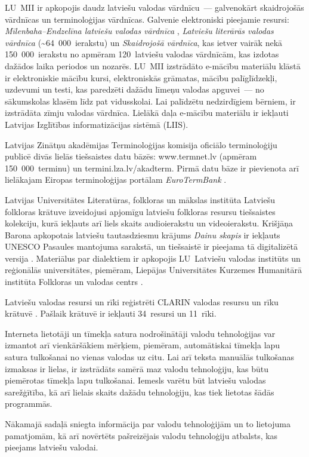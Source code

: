 \begin{multicols}{2}
LU~MII ir apkopojis daudz latviešu valodas vārd\-nīcu~--- galvenokārt skaidrojošās vārdnīcas un terminoloģijas vārdnīcas.
Galvenie elektroniski pieejamie resursi: \textit{Mīlenbaha--Endzelīna latviešu valodas vārdnīca} \cite{Meta10}, \textit{Latviešu literārās valodas vārdnīca} (\~{}64~000~ierakstu) un \textit{Skaidrojošā vārdnīca}, kas ietver vairāk nekā 150~000~ierakstu no apmēram 120~latviešu valodas vārdnīcām, kas izdotas dažādos laika periodos un nozarēs. 
LU~MII izstrādāto e-mācību materiālu klāstā ir elektroniskie mācību kursi, elektroniskās grāmatas, mācību palīglīdzekļi, uzdevumi un testi, kas paredzēti dažādu līmeņu valodas apguvei~--- no sākumskolas klasēm līdz pat vidusskolai.
Lai palīdzētu nedzirdīgiem bērniem, ir izstrādāta zīmju valodas vārdnīca.
Lielākā daļa e-mācību materiālu ir iekļauti Latvijas Izglītības informatizācijas sistēmā (LIIS). 

Latvijas Zinātņu akadēmijas Terminoloģijas komisija oficiālo terminoloģiju publicē divās lielās tiešsaistes datu bāzēs: www.termnet.lv (apmēram 150~000~terminu) un termini.lza.lv/akadterm.
Pirmā datu bāze ir pievienota arī lielākajam Eiropas terminoloģijas portālam \textit{EuroTermBank} \cite{Meta61}.

Latvijas Universitātes Literatūras, folkloras un mākslas institūta Latviešu folkloras krātuve \cite{Meta11} izveidojusi apjomīgu latviešu folkloras resursu tiešsaistes kolekciju, kurā iekļauts arī liels skaits audioierakstu un videoierakstu. 
Krišjāņa Barona apkopotais latviešu tautasdziesmu krājums \textit{Dainu skapis} ir iekļauts UNESCO Pasaules mantojuma sarakstā, un tiešsaistē ir pieejama tā digitalizētā versija \cite{Meta12}. 
Materiālus par dialektiem ir apkopojis LU~Latviešu valodas institūts un reģionālās universitātes, piemēram, Liepājas Universitātes Kurzemes Humanitārā institūta Folkloras un valodas centrs \cite{Meta13}.

Latviešu valodas resursi un rīki reģistrēti CLARIN valodas resursu un rīku krātuvē \cite{Meta14}.
Pašlaik krātuvē ir iekļauti 34~resursi un 11~rīki.

Interneta lietotāji un tīmekļa satura nodrošinātāji valodu tehnoloģijas var izmantot arī vienkāršākiem mērķiem, piemēram, automātiskai tīmekļa lapu satura tulkošanai no vienas valodas uz citu.
Lai arī teksta manuālās tulkošanas izmaksas ir lielas, ir izstrādāts samērā maz valodu tehnoloģiju, kas būtu piemērotas tīmekļa lapu tulkošanai.
Iemesls varētu būt latviešu valodas sarežģītība, kā arī lielais skaits dažādu tehnoloģiju, kas tiek lietotas šādās programmās.

Nākamajā sadaļā sniegta informācija par valodu tehnoloģijām un to lietojuma pamatjomām, kā arī novērtēts pašreizējais valodu tehnoloģiju atbalsts, kas pieejams latviešu valodai. 

\end{multicols}

